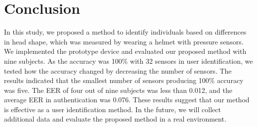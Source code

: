 \documentclass[sigconf,authordraft]{acmart}
\begin{document}
\section{Conclusion}
\label{sec:conclusion}
In this study, we proposed a method to identify individuals based on differences in head shape, which was measured by wearing a helmet with pressure sensors. We implemented the prototype device and evaluated our proposed method with nine subjects.
As the accuracy was 100\% with 32 sensors in user identification, we tested how the accuracy changed by decreasing the number of sensors. The results indicated that the smallest number of sensors producing 100\% accuracy was five. The EER of four out of nine subjects was less than 0.012, and the average EER in authentication was 0.076. These results suggest that our method is effective as a user identification method. In the future, we will collect additional data and evaluate the proposed method in a real environment.










\end{document}
